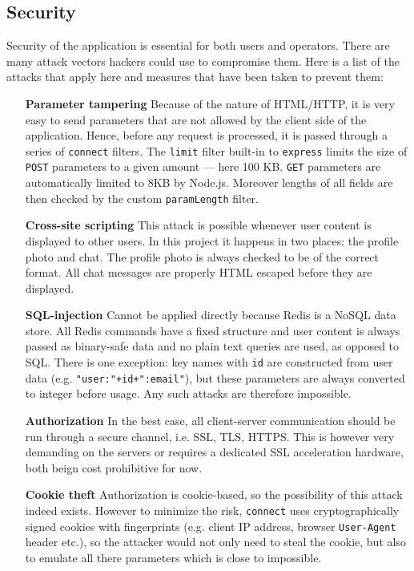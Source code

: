 \documentclass[12pt,oneside]{fithesis}
\begin{document}
	\subsection{Security}
		Security of the application is essential for both users and operators. There are many attack vectors hackers could use to compromise them. \cite{paper:dd} Here is a list of the attacks that apply here and measures that have been taken to prevent them:
		\begin{itemize}
			\item[\textbf{Parameter tampering}] 
				Because of the nature of HTML/HTTP, it is very easy to send parameters that are not allowed by the client side of the application. Hence, before any request is processed, it is passed through a series of \texttt{connect} filters. The \texttt{limit} filter built-in to \texttt{express} limits the size of \texttt{POST} parameters to a given amount --- here 100 KB. \texttt{GET} parameters are automatically limited to 8KB by Node.js. Moreover lengths of all fields are then checked by the custom \texttt{paramLength} filter. 
			\item[\textbf{Cross-site scripting}] 
				This attack is possible whenever user content is displayed to other users. In this project it happens in two places: the profile photo and chat. The profile photo is always checked to be of the correct format. All chat messages are properly HTML escaped before they are displayed.
			\item[\textbf{SQL-injection}]
				Cannot be applied directly because Redis is a NoSQL data store. All Redis commands have a fixed structure and user content is always passed as binary-safe data and no plain text queries are used, as opposed to SQL. There is one exception: key names with \texttt{id} are constructed from user data (e.g. \texttt{"user:"+id+":email"}), but these parameters are always converted to integer before usage. Any such attacks are therefore impossible.
			\item[\textbf{Authorization}] In the best case, all client-server communication should be run through a secure channel, i.e. SSL, TLS, HTTPS. This is however very demanding on the servers or requires a dedicated SSL acceleration hardware, both beign cost prohibitive for now.
			\item[\textbf{Cookie theft}]
				Authorization is cookie-based, so the possibility of this attack indeed exists. However to minimize the risk, \texttt{connect} uses cryptographically signed cookies with fingerprints (e.g. client IP address, browser \texttt{User-Agent} header etc.), so the attacker would not only need to steal the cookie, but also to emulate all there parameters which is close to impossible.				
		\end{itemize}		
\end{document}
